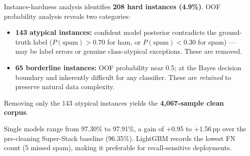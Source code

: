 \documentclass[conference]{IEEEtran}
\begin{document}
Instance-hardness analysis identifies \textbf{208 hard
instances (4.9\%)}. OOF probability analysis reveals two
categories:

\begin{itemize}
  \item \textbf{143 atypical instances:} confident model
        posterior contradicts the ground-truth label
        ($P(\text{spam})>0.70$ for ham, or
        $P(\text{spam})<0.30$ for spam) --- may be label
        errors or genuine class-atypical exceptions.
        These are removed.
  \item \textbf{65 borderline instances:} OOF probability
        near 0.5; at the Bayes decision boundary and
        inherently difficult for any classifier.
        These are \emph{retained} to preserve natural
        data complexity.
\end{itemize}

Removing only the 143 atypical instances yields the
\textbf{4,067-sample clean corpus}.

\begin{table}[htbp]
\caption{Cleaned Pipeline Results (4,067 samples; 3,253/814
split; chi-square top-50 features;
test at natural 39.4/60.6\% distribution)}
\label{tab:cleaned}
\centering
{}
\end{table}

Single models range from 97.30\% to 97.91\%, a gain of
+0.95 to +1.56\,pp over the pre-cleaning Super-Stack
baseline (96.35\%). LightGBM records the lowest FN count
(5 missed spam), making it preferable for recall-sensitive
deployments. 
\end{document}
